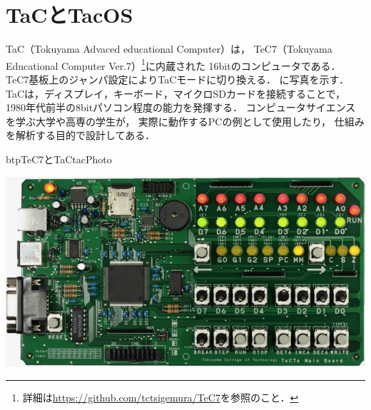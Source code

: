 \chapter{TaCとTacOS}
\label{TacAndTacOS}
TaC（Tokuyama Advaced educational Computer）は，
TeC7（Tokuyama Educational Computer Ver.7）\footnote{
  詳細は\url{https://github.com/tctsigemura/TeC7}を参照のこと．}に内蔵された
16bitのコンピュータである．
TeC7基板上のジャンパ設定によりTaCモードに切り換える．
に写真を示す．
TaCは，ディスプレイ，キーボード，マイクロSDカードを接続することで，
1980年代前半の8bitパソコン程度の能力を発揮する．
コンピュータサイエンスを学ぶ大学や高専の学生が，
実際に動作するPCの例として使用したり，
仕組みを解析する目的で設計してある．

\begin{myfig}{btp}{TeC7とTaC}{tacPhoto}
  \begin{minipage}{0.58\columnwidth}
    \begin{center}
      \includegraphics[scale=0.35]{Photo/TeC7.jpg}\\
      \label{fig:tec7Photo}
    \end{center}
  \end{minipage}
  \begin{minipage}{0.38\columnwidth}
    \begin{center}

\end{center}
\end{minipage}
\end{myfig}
